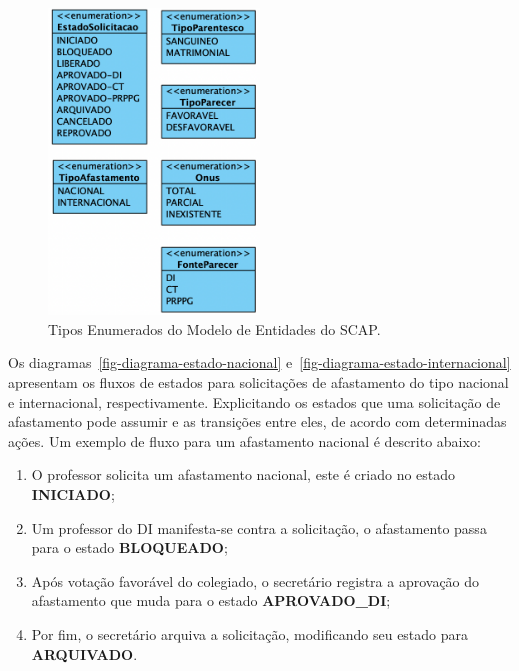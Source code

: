 \begin{figure}
    \centering
    \includegraphics[width=0.5\textwidth]{figuras/fig-modelo-entidades-enum.png}
    \caption{Tipos Enumerados do Modelo de Entidades do SCAP.}
    \label{fig-modelo-entidades-enum}
\end{figure}


Os diagramas~\ref{fig-diagrama-estado-nacional} e~\ref{fig-diagrama-estado-internacional} apresentam os fluxos de estados
para solicitações de afastamento do tipo nacional e internacional, respectivamente.
Explicitando os estados que uma solicitação de afastamento pode assumir e as transições entre eles,
de acordo com determinadas ações. Um exemplo de fluxo para um afastamento nacional é descrito abaixo:

\begin{enumerate}
    \item O professor solicita um afastamento nacional, este é criado no estado \textbf{INICIADO};
    \item Um professor do DI manifesta-se contra a solicitação, o afastamento passa para o estado \textbf{BLOQUEADO};
    \item Após votação favorável do colegiado, o secretário registra a aprovação do afastamento que muda para o estado \textbf{APROVADO\_DI};
    \item Por fim, o secretário arquiva a solicitação, modificando seu estado para \textbf{ARQUIVADO}.

\end{enumerate}

